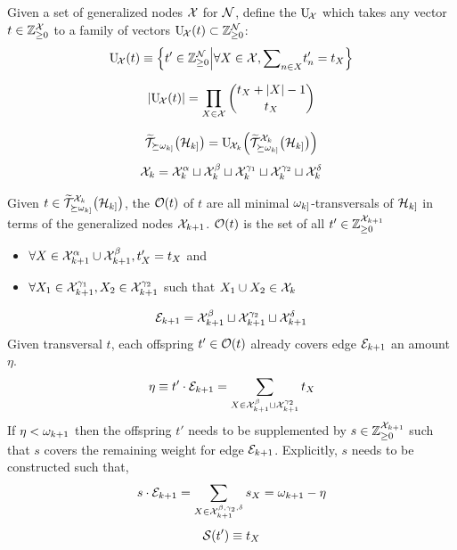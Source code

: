 \documentclass[aps, 10pt, english, twoside, twocolumn, pra, nofootinbib, tightenlines, longbibliography, superscriptaddress]{revtex4-1}
\begin{document}
    \begin{definition}
        Given a set of generalized nodes $\mathcal{X}$ for $\mathcal{N}$, define the  $\mathrm{U}_{\!\mathcal{X}}$ which takes any vector $t \in {\mathbb{Z}}_{\geq 0}^{\mathcal{X}}$ to a family of vectors $\mathrm{U}_{\!\s X}\br{t} \subset \Z_{\geq 0}^{\s N}$:
        \[ \mathrm{U}_{\!\s X}\br{t} \defined \bcm{t' \in \Z_{\geq 0}^{\s N}}{\forall X \in \s X, {\sum}_{n \in X} t'_{n} = t_{X}} \]
    \end{definition}
    \[ \abs{\mathrm{U}_{\!\s X}\br{t}} = \prod_{X \in \s X} \binom{t_{X} + \abs{X} - 1}{t_{X}} \]

    \[ \widetilde {\s T}_{\succeq \w_{k]}}\br{\s H_{k]}} = \mathrm{U}_{\!\s X_{k}}\br{\widetilde {\s T}_{\succeq \w_{k]}}^{\s X_{k}}\br{\s H_{k]}}} \]
    \[ \mathcal{X}_{k} = \mathcal{X}_{k}^{\alpha} \sqcup \mathcal{X}_{k}^{\beta} \sqcup \mathcal{X}_{k}^{\gamma_1} \sqcup \mathcal{X}_{k}^{\gamma_2} \sqcup \mathcal{X}_{k}^{\delta} \]

    \begin{definition}
        Given $t \in \widetilde {\s T}_{\succeq \w_{k]}}^{\s X_{k}}\br{\s H_{k]}}$, the  $\s O\br{t}$ of $t$ are all minimal $\omega_{k]}$-transversals of $\mathcal{H}_{k]}$ in terms of the generalized nodes $\mathcal{X}_{k+1}$. $\s O\br{t}$ is the set of all $t' \in {\mathbb{Z}}_{\geq 0}^{\mathcal{X}_{k+1}}$
        \begin{itemize}
            \item $\forall X \in \mathcal{X}_{k+1}^{\alpha} \cup \mathcal{X}_{k+1}^{\beta}, t'_{X} = t_{X}$ and
            \item $\forall X_1 \in \mathcal{X}_{k+1}^{\gamma_1}, X_2 \in \mathcal{X}_{k+1}^{\gamma_2}$ such that $X_1 \cup X_2 \in \mathcal{X}_{k}$
        \end{itemize}
    \end{definition}
    \[ \mathcal{E}_{k+1} = \mathcal{X}_{k+1}^{\beta} \sqcup \mathcal{X}_{k+1}^{\gamma_2} \sqcup \mathcal{X}_{k+1}^{\delta} \]
    Given transversal $t$, each offspring $t' \in \s O\br{t}$ already covers edge $\mathcal{E}_{k+1}$ an amount $\eta$.
    \[ \eta \equiv t' \cdot \mathcal{E}_{k+1} = \sum_{X \in \mathcal{X}_{k+1}^{\beta} \sqcup \mathcal{X}_{k+1}^{\gamma_2}} t_X \]
    If $\eta < \omega_{k+1}$ then the offspring $t'$ needs to be supplemented by $s \in {\mathbb{Z}}_{\geq 0}^{\mathcal{X}_{k+1}}$ such that $s$ covers the remaining weight for edge $\mathcal{E}_{k+1}$. Explicitly, $s$ needs to be constructed such that,
    \[ s \cdot \mathcal{E}_{k+1} = \sum_{X \in \mathcal{X}_{k+1}^{\beta, \gamma_2, \delta}} s_{X} = \omega_{k+1} - \eta  \]
    \[ \s S\br{t'} \defined  t_X \]
\end{document}
